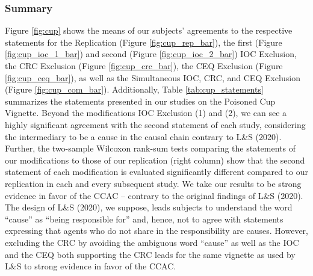 \documentclass[egregdoesnotlikesansseriftitles,12pt]{scrartcl}
\begin{document}
\subsubsection{Summary}\label{sec:results_cup_sum}
Figure \ref{fig:cup} shows the means of our subjects' agreements to the respective statements for the Replication (Figure \ref{fig:cup_rep_bar}), the first (Figure \ref{fig:cup_ioc_1_bar}) and second (Figure \ref{fig:cup_ioc_2_bar}) IOC Exclusion, the CRC Exclusion (Figure \ref{fig:cup_crc_bar}), the CEQ Exclusion (Figure \ref{fig:cup_ceq_bar}), as well as the Simultaneous IOC, CRC, and CEQ Exclusion (Figure \ref{fig:cup_com_bar}). Additionally, Table \ref{tab:cup_statements} summarizes the statements presented in our studies on the Poisoned Cup Vignette. Beyond the modifications IOC Exclusion (1) and (2), we can see a highly significant agreement with the second statement of each study, considering the intermediary to be a cause in the causal chain contrary to L\&S (2020). Further, the two-sample Wilcoxon rank-sum tests comparing the statements of our modifications to those of our replication (right column) show that the second statement of each modification is evaluated significantly different compared to our replication in each and every subsequent study. We take our results to be strong evidence in favor of the CCAC -- contrary to the original findings of L\&S (2020). The design of L\&S (2020), we suppose, leads subjects to understand the word ``cause'' as ``being responsible for'' and, hence, not to agree with statements expressing that agents who do not share in the responsibility are causes. However, excluding the CRC by avoiding the ambiguous word ``cause'' as well as the IOC and the CEQ both supporting the CRC leads for the same vignette as used by L\&S to strong evidence in favor of the CCAC.
\end{document}

